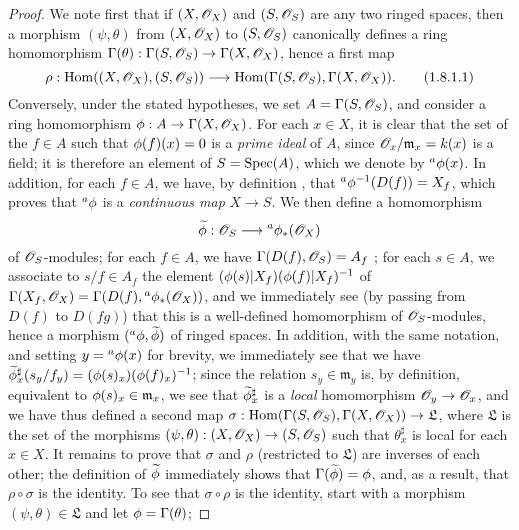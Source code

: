 \begin{proof}
\label{proof-I.1.8.1}
We note first that if $(X,\mathscr{O}_X)$ and $(S,\mathscr{O}_S)$ are any two ringed spaces, then a morphism $(\psi,\theta)$ from $(X,\mathscr{O}_X)$ to $(S,\mathscr{O}_S)$ canonically defines a ring homomorphism $\Gamma(\theta):\Gamma(S,\sh{O}_S)\to\Gamma(X,\sh{O}_X)$, hence a first map
\[
  \label{I.1.8.1.1}
  \rho:\Hom((X,\sh{O}_X),(S,\sh{O}_S))\to\Hom(\Gamma(S,\sh{O}_S),\Gamma(X,\sh{O}_X)).
  \tag{1.8.1.1}
\]
Conversely, under the stated hypotheses, we set $A=\Gamma(S,\mathscr{O}_S)$, and consider a ring homomorphism $\vphi:A\to\Gamma(X,\sh{O}_X)$.
For each $x\in X$, it is clear that the set of the $f\in A$ such that $\phi(f)(x)=0$ is a \emph{prime ideal} of $A$, since $\mathscr{O}_x/\mathfrak{m}_x=k(x)$ is a field;
it is therefore an element of $S=\operatorname{Spec}(A)$, which we denote by ${}^a\phi(x)$.
  In addition, for each $f\in A$, we have, by definition , that ${}^a\phi^{-1}(D(f))=X_f$, which proves that ${}^a\phi$ is a \emph{continuous map} $X\to S$.
We then define a homomorphism
\[
  \widetilde{\vphi}:\sh{O}_S\to{}^a\vphi_*(\sh{O}_X)
\]
of $\mathscr{O}_S$-modules;
for each $f\in A$, we have $\Gamma(D(f),\mathscr{O}_S)=A_f$ ;
for each $s\in A$, we associate to $s/f\in A_f$ the element $(\phi(s)|X_f)(\phi(f)|X_f)^{-1}$ of $\Gamma(X_f,\mathscr{O}_X)=\Gamma(D(f),{}^a\phi_*(\mathscr{O}_X))$, and we immediately see (by passing from $D(f)$ to $D(fg)$) that this is a well-defined homomorphism of $\mathscr{O}_S$-modules, hence a morphism $({}^a\phi,\widetilde{\phi})$ of ringed spaces.
In addition, with the same notation, and setting $y={}^a\phi(x)$ for brevity, we immediately see  that we have $\widetilde{\phi}_x^\sharp(s_y/f_y)=(\phi(s)_x)(\phi(f)_x)^{-1}$;
since the relation $s_y\in\mathfrak{m}_y$ is, by definition, equivalent to $\phi(s)_x\in\mathfrak{m}_x$, we see that $\widetilde{\phi}_x^\sharp$ is a \emph{local} homomorphism $\sh{O}_y\to\sh{O}_x$, and we have thus defined a second map $\sigma:\Hom(\Gamma(S,\sh{O}_S),\Gamma(X,\sh{O}_X))\to\mathfrak{L}$, where $\mathfrak{L}$ is the set of the morphisms $(\psi,\theta):(X,\sh{O}_X)\to(S,\sh{O}_S)$ such that $\theta_x^\sharp$ is local for each $x\in X$.
It remains to prove that $\sigma$ and $\rho$ (restricted to $\mathfrak{L}$) are inverses of each other;
the definition of $\widetilde{\phi}$ immediately shows that $\Gamma(\widetilde{\phi})=\phi$, and, as a result, that $\rho\circ\sigma$ is the identity.
To see that $\sigma\circ\rho$ is the identity, start with a morphism $(\psi,\theta)\in\mathfrak{L}$ and let $\phi=\Gamma(\theta)$;

\end{proof}
